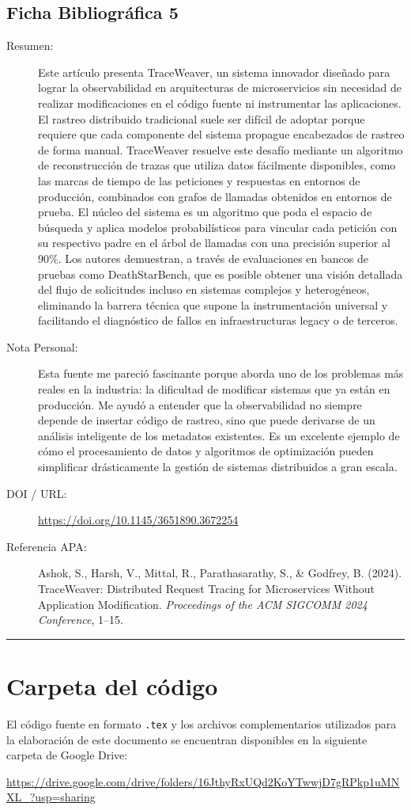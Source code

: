 \documentclass[12pt]{article}
\begin{document}
\subsection{Ficha Bibliográfica 5}
\begin{description}
    \item[Resumen:] Este artículo presenta TraceWeaver, un sistema innovador diseñado para lograr la observabilidad en arquitecturas de microservicios sin necesidad de realizar modificaciones en el código fuente ni instrumentar las aplicaciones. El rastreo distribuido tradicional suele ser difícil de adoptar porque requiere que cada componente del sistema propague encabezados de rastreo de forma manual. TraceWeaver resuelve este desafío mediante un algoritmo de reconstrucción de trazas que utiliza datos fácilmente disponibles, como las marcas de tiempo de las peticiones y respuestas en entornos de producción, combinados con grafos de llamadas obtenidos en entornos de prueba. El núcleo del sistema es un algoritmo que poda el espacio de búsqueda y aplica modelos probabilísticos para vincular cada petición con su respectivo padre en el árbol de llamadas con una precisión superior al 90\%. Los autores demuestran, a través de evaluaciones en bancos de pruebas como DeathStarBench, que es posible obtener una visión detallada del flujo de solicitudes incluso en sistemas complejos y heterogéneos, eliminando la barrera técnica que supone la instrumentación universal y facilitando el diagnóstico de fallos en infraestructuras legacy o de terceros.
    \item[Nota Personal:] Esta fuente me pareció fascinante porque aborda uno de los problemas más reales en la industria: la dificultad de modificar sistemas que ya están en producción. Me ayudó a entender que la observabilidad no siempre depende de insertar código de rastreo, sino que puede derivarse de un análisis inteligente de los metadatos existentes. Es un excelente ejemplo de cómo el procesamiento de datos y algoritmos de optimización pueden simplificar drásticamente la gestión de sistemas distribuidos a gran escala.
    \item[DOI / URL:] \url{https://doi.org/10.1145/3651890.3672254}
    \item[Referencia APA:] Ashok, S., Harsh, V., Mittal, R., Parathasarathy, S., \& Godfrey, B. (2024). TraceWeaver: Distributed Request Tracing for Microservices Without Application Modification. \textit{Proceedings of the ACM SIGCOMM 2024 Conference}, 1–15.
\end{description}
\noindent\rule{\textwidth}{0.4pt}
\vspace{5.5cm}

\section{Carpeta del código}
El código fuente en formato \texttt{.tex} y los archivos complementarios utilizados para la elaboración de este documento se encuentran disponibles en la siguiente carpeta de Google Drive:


\noindent\url{https://drive.google.com/drive/folders/16JthyRxUQd2KoYTwwjD7gRPkp1uMNXL_?usp=sharing}
\end{document}
